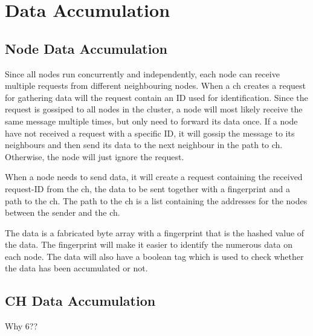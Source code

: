 \documentclass[USenglish]{uit-thesis}
\begin{document}




\section{Data Accumulation}


\subsection{Node Data Accumulation}
Since all nodes run concurrently and independently, each node can receive multiple requests from different neighbouring nodes. When a \gls{ch} creates a request for gathering data will the request contain an ID used for identification. Since the request is gossiped to all nodes in the cluster, a node will most likely receive the same message multiple times, but only need to forward its data once. If a node have not received a request with a specific ID, it will gossip the message to its neighbours and then send its data to the next neighbour in the path to \gls{ch}. Otherwise, the node will just ignore the request.

When a node needs to send data, it will create a request containing the received request-ID from the \gls{ch}, the data to be sent together with a fingerprint and a path to the \gls{ch}. The path to the \gls{ch} is a list containing the addresses for the nodes between the sender and the \gls{ch}.


The data is a fabricated byte array with a fingerprint that is the hashed value of the data. The fingerprint will make it easier to identify the numerous data on each node. The data will also have a boolean tag which is used to check whether the data has been accumulated or not. 

\subsection{CH Data Accumulation}
Why 6??
 
\end{document}
